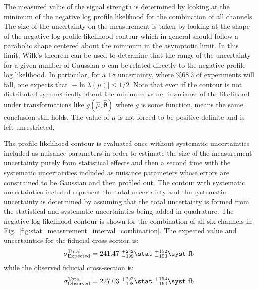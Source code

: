 The measured value of the signal strength is determined by looking at the minimum 
of the negative log profile likelihood 
for the combination of all channels. The size of the uncertainty on the 
measurement is taken by looking at the shape of the negative log 
profile likelihood contour which in general should follow a parabolic
shape centered about the minimum in the asymptotic limit. In this limit,
Wilk's theorem \cite{Wilk:1938}
can be used \cite{PDG:2014}
to determine that
the range of the 
uncertainty for a given number of Gaussian $\sigma$ can be related
directly 
to the negative profile log likelihood.  In particular, for 
a $1\sigma$ uncertainty, where $\% 68.3$ of experiments will fall, 
one expects that 
$|-\ln \lambda(\mu)| \leq 1/2$.
Note that even if the contour is not distributed symmetrically about the minimum
value, invariance of the likelihood under 
transformations like $g(\hat{\mu},\hat{\boldsymbol{\theta}})$ where $g$ is some function, 
means the same conclusion still holds.
The value of $\mu$ is not forced to be positive definite and is left unrestricted. 

The profile likelihood contour is evaluated once without systematic uncertainties included
as nuisance parameters in order to estimate the size of the measurement uncertainty purely 
from statistical effects and then a second time with the systematic uncertainties included
as nuisance parameters whose errors are constrained to be Gaussian and then 
profiled out. The contour with systematic uncertainties included represent
the total uncertainty and the systematic uncertainty is determined by assuming that
the total uncertainty is formed from the statistical and systematic uncertainties being added
in quadrature.
The negative log likelihood contour is shown
for the combination of all six channels in 
Fig.~\ref{fig:stat_measurement_interval_combination}.
The expected value and uncertainties for the fiducial cross-section is:
\begin{equation}
\sigma^{\textrm{Total}}_{\textrm{Expected}} = 241.47 ~ ^{+232}_{-199} \stat ~^{+152}_{-153}\syst ~\textrm{fb}
\end{equation}
while the observed fiducial cross-section is:
\begin{equation}
\sigma^{\textrm{Total}}_{\textrm{Observed}} = 227.03 ~ ^{+202}_{-198} \stat ~^{+154}_{-160} \syst ~\textrm{fb}
\end{equation}

